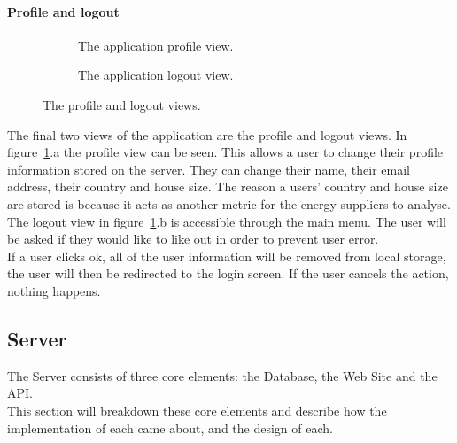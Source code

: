 \documentclass[draft,preprint,12pt,3p]{elsarticle}
\begin{document}
\paragraph{Profile and logout}
\begin{figure}[H]
    \centering
    \begin{subfigure}[t]{0.32\columnwidth}
        \centering
        \caption{The application profile view.}
    \end{subfigure}
    \begin{subfigure}[t]{0.32\columnwidth}
        \centering
        \caption{The application logout view.}
    \end{subfigure}
    \caption{The profile and logout views.}
    \label{fig:profilelogout}
\end{figure}
The final two views of the application are the profile and logout views.
In figure~\ref{fig:profilelogout}.a the profile view can be seen. This allows a user to change their profile information stored on the server. They can change their name, their email address, their country and house size. The reason a users' country and house size are stored is because it acts as another metric for the energy suppliers to analyse.\\
The logout view in figure~\ref{fig:profilelogout}.b is accessible through the main menu. The user will be asked if they would like to like out in order to prevent user error.\\
If a user clicks ok, all of the user information will be removed from local storage, the user will then be redirected to the login screen. If the user cancels the action, nothing happens. 

\clearpage
\subsection{Server}
The Server consists of three core elements: the Database, the Web Site and the API.\\
This section will breakdown these core elements and describe how the implementation of each came about, and the design of each.
\end{document}
